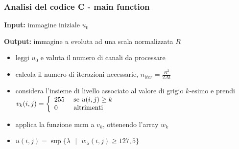 \documentclass{beamer}
\begin{document}
\begin{frame}

  \frametitle{Analisi del codice C - \alert{main} function}

  {\bf Input:} immagine iniziale $u_0$

  \vspace{0.5em}

  {\bf Output:} immagine $u$ evoluta ad una scala normalizzata $R$

  \vspace{0.5em}

  \begin{itemize}
    \item leggi $u_0$ e valuta il numero di canali da processare 
    \item calcola il numero di iterazioni necessarie, $n_{iter}=\displaystyle\frac{R^2}{2\Delta t}$
    \item considera l'insieme di livello associato al valore di grigio $k$-esimo e prendi $v_k(i,j)=\left\{
  \begin{array}{ll}
    255 & \hbox{ se } u(i,j) \ge k \\
    0 & \hbox{ altrimenti } \\
  \end{array}
\right.
$
    \item applica la funzione \alert{mcm} a $v_k$, ottenendo l'array $w_k$
    \item $u(i,j)=\sup\{\lambda\mbox{ }|\mbox{ } w_{\lambda}(i,j)\ge 127,5\}$
  \end{itemize}

\end{frame}
\end{document}
